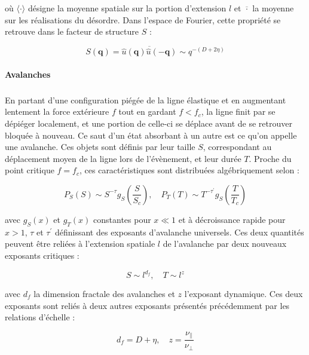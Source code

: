 \noindent où $\langle \cdot \rangle$ désigne la moyenne spatiale sur la portion d'extension $l$ et $\overline{\cdot}$ la moyenne sur les réalisations du désordre. Dans l'espace de Fourier, cette propriété se retrouve dans le facteur de structure $S$ : 

\begin{equation}
	S(\mathbf{q}) = \overline{\hat{u}(\mathbf{q})\hat{u}(-\mathbf{q})} \sim q^{-(D+2\eta)}
\end{equation}

\paragraph{Avalanches}

\subparagraph{}En partant d'une configuration piégée de la ligne élastique et en augmentant lentement la force extérieure $f$ tout en gardant $f<f_c$, la ligne finit par se dépiéger localement, et une portion de celle-ci se déplace avant de se retrouver bloquée à nouveau. Ce saut d'un état absorbant à un autre est ce qu'on appelle une avalanche. Ces objets sont définis par leur taille $S$, correspondant au déplacement moyen de la ligne lors de l'évènement, et leur durée $T$. Proche du point critique $f=f_c$, ces caractéristiques sont distribuées algébriquement selon \cite{narayan_threshold_1993, rosso_avalanche_size_2009, le_doussal_statistics_2009, le_doussal_size_2009, wiese_theory_2022} :

\begin{equation}
P_S(S) \sim S^{-\tau}g_S\left( \frac{S}{S_c} \right), \quad P_T(T) \sim T^{-\tau^\prime}g_S\left( \frac{T}{T_c} \right)
\end{equation}

\noindent avec $g_S(x)$ et $g_T(x)$ constantes pour $x\ll 1$ et à décroissance rapide pour $x>1$, $\tau$ et $\tau^\prime$ définissant des exposants d'avalanche universels. Ces deux quantités peuvent être reliées à l'extension spatiale $l$ de l'avalanche par deux nouveaux exposants critiques :

\begin{equation}
	S \sim l^{d_f}, \quad T \sim l^z
\end{equation}

\noindent avec $d_f$ la dimension fractale des avalanches et $z$ l'exposant dynamique. Ces deux exposants sont reliés à deux autres exposants présentés précédemment par les relations d'échelle :

\begin{equation}
	d_f = D + \eta, \quad z = \frac{\nu_\parallel}{\nu_\perp}
\end{equation}

